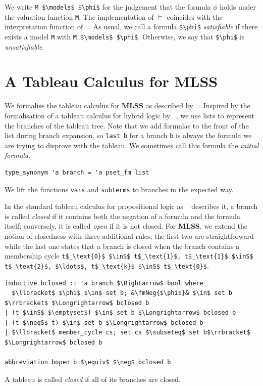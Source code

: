 \documentclass[runningheads]{llncs}
\newcommand{\MLSS}{\textbf{MLSS}}
\newcommand{\inS}{\in_\text{s}}
\newcommand{\neqS}{\neq_\text{s}}
\newcommand{\fmNegSymbol}{\boldsymbol{\neg}}
\newcommand{\fmNeg}[1]{$\fmNegSymbol\:$#1}
\begin{document}
We write \lstinline!M $\models$ $\phi$! for the judgement that the formula $\phi$ holds under the valuation function \lstinline!M!.
The implementation of $\models$ coincides with the interpretation function of \citeauthor{lqe}~\cite{lqe}.
As usual, we call a formula \lstinline!$\phi$! \emph{satisfiable} if there exists a model \lstinline!M! with \lstinline!M $\models$ $\phi$!.
Otherwise, we say that \lstinline!$\phi$! is \emph{unsatisfiable}.

\section{A Tableau Calculus for MLSS}
We formalise the tableau calculus for \MLSS{} as described by \citeauthor{new_fast_tableau}~\cite{new_fast_tableau}.
Inspired by the formalisation of a tableau calculus for hybrid logic by \citeauthor{hybrid_logic_afp}~\cite{hybrid_logic_afp}, we use lists to represent the branches of the tableau tree.
Note that we add formulas to the front of the list during branch expansion, so \lstinline!last b! for a branch \lstinline!b! is always the formula we are trying to disprove with the tableau.
We sometimes call this formula the \emph{initial formula}.
\begin{lstlisting}
type_synonym 'a branch = 'a pset_fm list
\end{lstlisting}

\noindent We lift the functions \lstinline!vars! and \lstinline!subterms! to branches in the expected way.

In the standard tableau calculus for propositional logic as \citeauthor{tableau}~\cite{tableau} describes it, a branch is called \emph{closed} if it contains both the negation of a formula and the formula itself;
conversely, it is called \emph{open} if it is not closed.
For \MLSS{}, we extend the notion of closedness with three additional rules; the first two are straightforward while the last one states that a branch is closed when the branch contains a membership cycle
\lstinline!t$_\text{0}$ $\inS$ t$_\text{1}$, t$_\text{1}$ $\inS$ t$_\text{2}$, $\ldots$, t$_\text{k}$ $\inS$ t$_\text{0}$!.

\begin{lstlisting}
inductive bclosed :: 'a branch $\Rightarrow$ bool where
  $\llbracket$ $\phi$ $\in$ set b; &\fmNeg{$\phi$}& $\in$ set b $\rrbracket$ $\Longrightarrow$ bclosed b
| (t $\inS$ $\emptyset$) $\in$ set b $\Longrightarrow$ bclosed b
| (t $\neqS$ t) $\in$ set b $\Longrightarrow$ bclosed b
| $\llbracket$ member_cycle cs; set cs $\subseteq$ set b$\rrbracket$ $\Longrightarrow$ bclosed b

abbreviation bopen b $\equiv$ $\neg$ bclosed b
\end{lstlisting}
A tableau is called \emph{closed} if all of its branches are closed.
\end{document}
